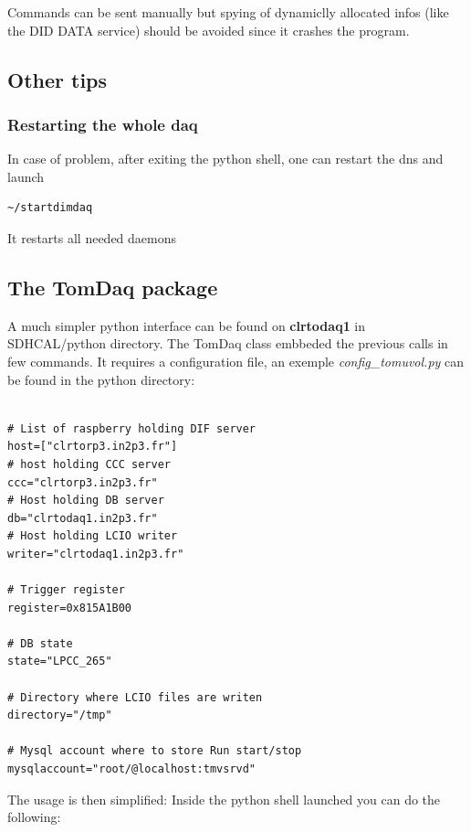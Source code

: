 \documentclass[english]{article}
\begin{document}
Commands can be sent manually but spying of dynamiclly allocated infos (like the DID DATA service) should be avoided since it crashes the program. 
\subsection{Other tips}
\subsubsection{Restarting the whole daq}
In case of problem, after exiting the python shell, one can restart the dns and launch
\begin{verbatim}
~/startdimdaq
\end{verbatim}
It restarts all needed daemons

\subsection{The TomDaq package}

A  much simpler python interface can be found on {\bf clrtodaq1} in SDHCAL/python directory. The TomDaq class embbeded the previous calls in few commands. It requires a configuration file, an exemple {\sl config\_tomuvol.py }can be found in the python directory:
\begin{verbatim}

# List of raspberry holding DIF server
host=["clrtorp3.in2p3.fr"]
# host holding CCC server
ccc="clrtorp3.in2p3.fr"
# Host holding DB server
db="clrtodaq1.in2p3.fr"
# Host holding LCIO writer
writer="clrtodaq1.in2p3.fr"

# Trigger register 
register=0x815A1B00

# DB state
state="LPCC_265"

# Directory where LCIO files are writen
directory="/tmp"

# Mysql account where to store Run start/stop
mysqlaccount="root/@localhost:tmvsrvd"

\end{verbatim}


The usage is then simplified:
Inside the python shell launched you can do the following:
\end{document}
